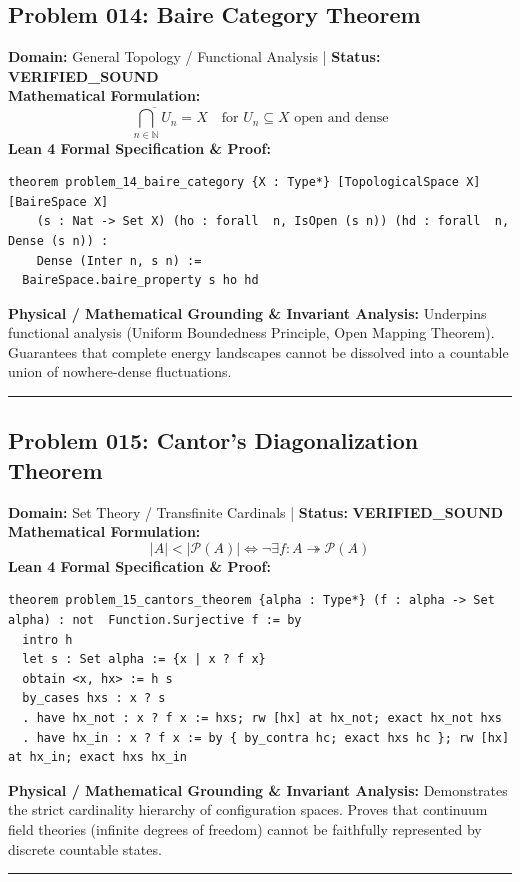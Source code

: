 \documentclass[10pt,a4paper]{article}
\begin{document}
\subsection*{Problem 014: Baire Category Theorem}
\textbf{Domain:} General Topology / Functional Analysis \quad | \quad \textbf{Status:} \textcolor{green!70!black}{\textbf{VERIFIED\_SOUND}}\\
\textbf{Mathematical Formulation:}
\begin{equation*}
  \overline{\bigcap_{n \in \mathbb{N}} U_n} = X \quad \text{for } U_n \subseteq X \text{ open and dense}
\end{equation*}
\textbf{Lean 4 Formal Specification \& Proof:}
\begin{lstlisting}
theorem problem_14_baire_category {X : Type*} [TopologicalSpace X] [BaireSpace X] 
    (s : Nat -> Set X) (ho : forall  n, IsOpen (s n)) (hd : forall  n, Dense (s n)) : 
    Dense (Inter n, s n) :=
  BaireSpace.baire_property s ho hd
\end{lstlisting}
\textbf{Physical / Mathematical Grounding \& Invariant Analysis:}
Underpins functional analysis (Uniform Boundedness Principle, Open Mapping Theorem). Guarantees that complete energy landscapes cannot be dissolved into a countable union of nowhere-dense fluctuations.
\vspace{0.8em}\hrule\vspace{0.8em}
\subsection*{Problem 015: Cantor's Diagonalization Theorem}
\textbf{Domain:} Set Theory / Transfinite Cardinals \quad | \quad \textbf{Status:} \textcolor{green!70!black}{\textbf{VERIFIED\_SOUND}}\\
\textbf{Mathematical Formulation:}
\begin{equation*}
  |A| < |\mathcal{P}(A)| \iff \neg \exists f: A \twoheadrightarrow \mathcal{P}(A)
\end{equation*}
\textbf{Lean 4 Formal Specification \& Proof:}
\begin{lstlisting}
theorem problem_15_cantors_theorem {alpha : Type*} (f : alpha -> Set alpha) : not  Function.Surjective f := by
  intro h
  let s : Set alpha := {x | x ? f x}
  obtain <x, hx> := h s
  by_cases hxs : x ? s
  . have hx_not : x ? f x := hxs; rw [hx] at hx_not; exact hx_not hxs
  . have hx_in : x ? f x := by { by_contra hc; exact hxs hc }; rw [hx] at hx_in; exact hxs hx_in
\end{lstlisting}
\textbf{Physical / Mathematical Grounding \& Invariant Analysis:}
Demonstrates the strict cardinality hierarchy of configuration spaces. Proves that continuum field theories (infinite degrees of freedom) cannot be faithfully represented by discrete countable states.
\vspace{0.8em}\hrule\vspace{0.8em}
\end{document}
